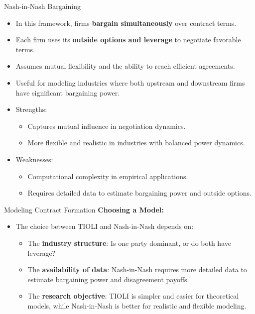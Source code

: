 \documentclass[aspectratio=169]{beamer}  %
\begin{document}
\begin{frame}{Nash-in-Nash Bargaining}
\begin{itemize}
    \item In this framework, firms \textbf{bargain simultaneously} over contract terms.
    \item Each firm uses its \textbf{outside options and leverage} to negotiate favorable terms.
    \item Assumes mutual flexibility and the ability to reach efficient agreements.
    \item Useful for modeling industries where both upstream and downstream firms have significant bargaining power.
    \item Strengths:
    \begin{itemize}
        \item Captures mutual influence in negotiation dynamics.
        \item More flexible and realistic in industries with balanced power dynamics.
    \end{itemize}
    \item Weaknesses:
    \begin{itemize}
        \item Computational complexity in empirical applications.
        \item Requires detailed data to estimate bargaining power and outside options.
    \end{itemize}
\end{itemize}
\end{frame}

\begin{frame}{Modeling Contract Formation}
\textbf{Choosing a Model:}
\begin{itemize}
    \item The choice between TIOLI and Nash-in-Nash depends on:
    \begin{itemize}
        \item The \textbf{industry structure}: Is one party dominant, or do both have leverage?
        \item The \textbf{availability of data}: Nash-in-Nash requires more detailed data to estimate bargaining power and disagreement payoffs.
        \item The \textbf{research objective}: TIOLI is simpler and easier for theoretical models, while Nash-in-Nash is better for realistic and flexible modeling.
    \end{itemize}
\end{itemize}
\end{frame}
\end{document}
